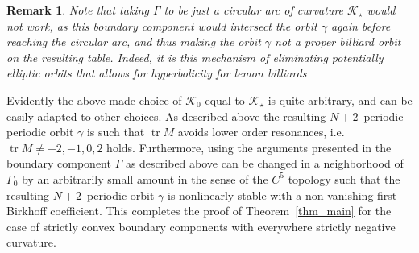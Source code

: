 \documentclass{amsart}
\theoremstyle{plain} %
\newtheorem{remark}[theorem]{Remark}
\begin{document}
\begin{remark}
  Note that taking $\Gamma$ to be just a circular arc
  of curvature ${\mathcal K}_\star$ would not work, as
  this boundary component would intersect the orbit $\gamma$ again
  before reaching the circular arc, and
  thus making the orbit $\gamma$ not a proper billiard orbit
  on the resulting table. Indeed, it is this mechanism of eliminating
  potentially elliptic orbits that allows for hyperbolicity
  for lemon billiards \cites{MR3452271,MR4183371}
\end{remark}


Evidently the above made choice of ${\mathcal K}_0$
equal to ${\mathcal K}_\star$ is quite arbitrary, and can
be easily adapted to other choices. As described above the resulting
$N+2$--periodic periodic orbit $\gamma$ is such that
$\operatorname{tr} M$ avoids lower order resonances, i.e.
$\operatorname{tr} M \neq -2, -1, 0, 2$ holds.
Furthermore, using the arguments presented in
\cites{MR2563800,bunimovich2018smoothconvexchaoticbilliard}
the boundary component $\Gamma$ as described above
can be changed in a neighborhood of $\Gamma_0$
by an arbitrarily small amount in the sense of the $C^5$ topology
such that the resulting $N+2$--periodic
orbit $\gamma$ is nonlinearly stable with a non-vanishing
first Birkhoff coefficient.
This completes the proof of Theorem~\ref{thm_main} for the case of
strictly convex boundary components with everywhere
strictly negative curvature.



%


%
%
\end{document}
